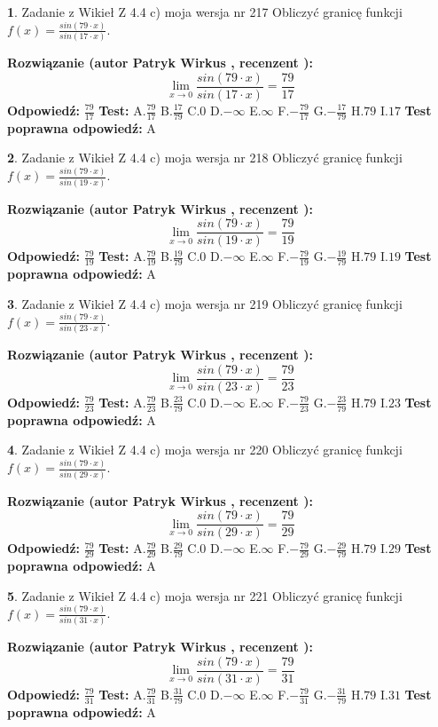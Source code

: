 \documentclass[12pt, a4paper]{article}
\theoremstyle{definition} %
\newtheorem{zad}{}
\newcommand{\zadStart}[1]{\begin{zad}#1\newline}
\newcommand{\zadStop}{\end{zad}}
\newcommand{\rozwStart}[2]{\noindent \textbf{Rozwiązanie (autor #1 , recenzent #2): }\newline}
\newcommand{\rozwStop}{\newline}
\newcommand{\odpStart}{\noindent \textbf{Odpowiedź:}\newline}
\newcommand{\odpStop}{\newline}
\newcommand{\testStart}{\noindent \textbf{Test:}\newline}
\newcommand{\testStop}{\newline}
\newcommand{\kluczStart}{\noindent \textbf{Test poprawna odpowiedź:}\newline}
\newcommand{\kluczStop}{\newline}
\begin{document}
\zadStart{Zadanie z Wikieł Z 4.4 c) moja wersja nr 217}
Obliczyć granicę funkcji $f(x)=\frac{sin(79\cdot x)}{sin(17\cdot x)}$.
\zadStop
\rozwStart{Patryk Wirkus}{}
$$\lim\limits_{x\to 0}\frac{sin(79\cdot x)}{sin(17\cdot x)}=
\frac{79}{17}$$
\rozwStop
\odpStart
$\frac{79}{17}$
\odpStop
\testStart
A.$\frac{79}{17}$
B.$\frac{17}{79}$
C.$0$
D.$-\infty$
E.$\infty$
F.$-\frac{79}{17}$
G.$-\frac{17}{79}$
H.$79$
I.$17$
\testStop
\kluczStart
A
\kluczStop



\zadStart{Zadanie z Wikieł Z 4.4 c) moja wersja nr 218}
Obliczyć granicę funkcji $f(x)=\frac{sin(79\cdot x)}{sin(19\cdot x)}$.
\zadStop
\rozwStart{Patryk Wirkus}{}
$$\lim\limits_{x\to 0}\frac{sin(79\cdot x)}{sin(19\cdot x)}=
\frac{79}{19}$$
\rozwStop
\odpStart
$\frac{79}{19}$
\odpStop
\testStart
A.$\frac{79}{19}$
B.$\frac{19}{79}$
C.$0$
D.$-\infty$
E.$\infty$
F.$-\frac{79}{19}$
G.$-\frac{19}{79}$
H.$79$
I.$19$
\testStop
\kluczStart
A
\kluczStop



\zadStart{Zadanie z Wikieł Z 4.4 c) moja wersja nr 219}
Obliczyć granicę funkcji $f(x)=\frac{sin(79\cdot x)}{sin(23\cdot x)}$.
\zadStop
\rozwStart{Patryk Wirkus}{}
$$\lim\limits_{x\to 0}\frac{sin(79\cdot x)}{sin(23\cdot x)}=
\frac{79}{23}$$
\rozwStop
\odpStart
$\frac{79}{23}$
\odpStop
\testStart
A.$\frac{79}{23}$
B.$\frac{23}{79}$
C.$0$
D.$-\infty$
E.$\infty$
F.$-\frac{79}{23}$
G.$-\frac{23}{79}$
H.$79$
I.$23$
\testStop
\kluczStart
A
\kluczStop



\zadStart{Zadanie z Wikieł Z 4.4 c) moja wersja nr 220}
Obliczyć granicę funkcji $f(x)=\frac{sin(79\cdot x)}{sin(29\cdot x)}$.
\zadStop
\rozwStart{Patryk Wirkus}{}
$$\lim\limits_{x\to 0}\frac{sin(79\cdot x)}{sin(29\cdot x)}=
\frac{79}{29}$$
\rozwStop
\odpStart
$\frac{79}{29}$
\odpStop
\testStart
A.$\frac{79}{29}$
B.$\frac{29}{79}$
C.$0$
D.$-\infty$
E.$\infty$
F.$-\frac{79}{29}$
G.$-\frac{29}{79}$
H.$79$
I.$29$
\testStop
\kluczStart
A
\kluczStop



\zadStart{Zadanie z Wikieł Z 4.4 c) moja wersja nr 221}
Obliczyć granicę funkcji $f(x)=\frac{sin(79\cdot x)}{sin(31\cdot x)}$.
\zadStop
\rozwStart{Patryk Wirkus}{}
$$\lim\limits_{x\to 0}\frac{sin(79\cdot x)}{sin(31\cdot x)}=
\frac{79}{31}$$
\rozwStop
\odpStart
$\frac{79}{31}$
\odpStop
\testStart
A.$\frac{79}{31}$
B.$\frac{31}{79}$
C.$0$
D.$-\infty$
E.$\infty$
F.$-\frac{79}{31}$
G.$-\frac{31}{79}$
H.$79$
I.$31$
\testStop
\kluczStart
A
\kluczStop
\end{document}
